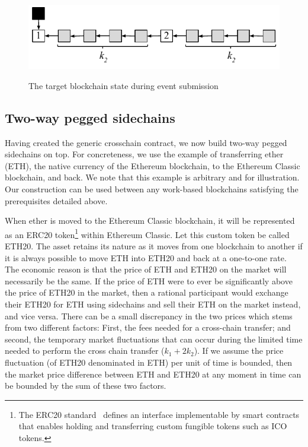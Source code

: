\begin{figure}
    \caption{The target blockchain state during event submission}
    \centering
    \includegraphics[width=0.6 \columnwidth,keepaspectratio]{figures/contestation.pdf}
    \label{fig.contestation}
\end{figure}

\subsection*{Two-way pegged sidechains}
Having created the generic crosschain contract, we now build two-way pegged
sidechains on top. For concreteness, we use the example of transferring ether
(ETH), the native currency of the Ethereum blockchain, to the Ethereum Classic
blockchain, and back. We note that this example is arbitrary and for
illustration. Our construction can be used between any work-based blockchains
satisfying the prerequisites detailed above.

When ether is moved to the Ethereum Classic blockchain, it will be represented
as an ERC20 token\footnote{The ERC20 standard~\cite{erc20} defines an interface
implementable by smart contracts that enables holding and transferring custom
fungible tokens such as ICO tokens.} within Ethereum Classic. Let this custom
token be called ETH20. The asset retains its nature as it moves from one
blockchain to another if it is always possible to move ETH into ETH20 and back
at a one-to-one rate. The economic reason is that the price of ETH and ETH20 on
the market will necessarily be the same. If the price of ETH were to ever be
significantly above the price of ETH20 in the market, then a rational
participant would exchange their ETH20 for ETH using sidechains and sell their
ETH on the market instead, and vice versa. There can be a small discrepancy in
the two prices which stems from two different factors: First, the fees needed
for a cross-chain transfer; and second, the temporary market fluctuations that
can occur during the limited time needed to perform the cross chain transfer
($k_1 + 2k_2$). If we assume the price fluctuation (of ETH20 denominated in ETH)
per unit of time is bounded, then the market price difference between ETH and
ETH20 at any moment in time can be bounded by the sum of these two factors.

